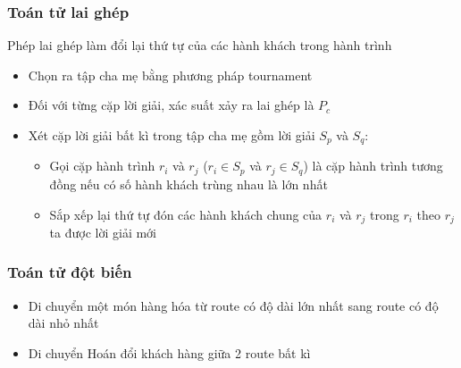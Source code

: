 \documentclass{beamer}
\begin{document}
	\begin{frame}
		\frametitle{Toán tử lai ghép}
		Phép lai ghép làm đổi lại thứ tự của các hành khách trong hành trình
		\begin{itemize}
			\item Chọn ra tập cha mẹ bằng phương pháp tournament
			\item Đối với từng cặp lời giải, xác suất xảy ra lai ghép là $P_c$
			\item Xét cặp lời giải bất kì trong tập cha mẹ gồm lời giải $S_p$ và $S_q$:
				\begin{itemize}
					\item Gọi cặp hành trình $r_i$ và $r_j$ ($r_i \in S_p$ và $r_j \in S_q$) là cặp hành trình tương đồng nếu có số hành khách trùng nhau là lớn nhất
					\item Sắp xếp lại thứ tự đón các hành khách chung của $r_i$ và $r_j$ trong $r_i$ theo $r_j$ ta được lời giải mới
				\end{itemize}
		\end{itemize}
	\end{frame}

	\begin{frame}
		\frametitle{Toán tử đột biến}
		\begin{itemize}
			\item Di chuyển một món hàng hóa từ route có độ dài lớn nhất sang route có độ dài nhỏ nhất
			\item Di chuyển Hoán đổi khách hàng giữa 2 route bất kì
		\end{itemize}
	\end{frame}
	
\end{document}
